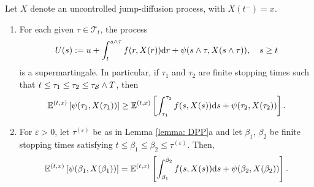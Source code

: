 \begin{corollary}
\label{cor: Corollary 10.5 in ØS}
    Let $X$ denote an uncontrolled jump-diffusion process, with $X(t^-)=x$. 
    \begin{enumerate}[label=(\alph*)]
        \item For each given $\tau \in \mathcal{T}_t$, the process 
        \begin{equation*}
            U(s) := u + \int_t^{s \wedge \tau} f(r, X(r)) \mathrm{d} r + \psi(s \wedge \tau,X(s \wedge \tau)), \quad s \geq t
        \end{equation*}
        is a supermartingale. In particular, if $\tau_1$ and $\tau_2$ are finite stopping times such that $t \leq \tau_1 \leq \tau_2 \leq \tau_{\mathcal{S}} \wedge T$, then
        \begin{equation*}
            \mathbb{E}^{(t,x)} \left[ \psi(\tau_1, X(\tau_1)) \right] \geq \mathbb{E}^{(t,x)}\left[ \int_{\tau_1}^{\tau_2} f(s,X(s)) \mathrm{d} s + \psi(\tau_2, X(\tau_2)) \right].
        \end{equation*}
        \item For $\varepsilon>0$, let $\tau^{(\varepsilon)}$ be as in Lemma \ref{lemma: DPP}a and let $\beta_1$, $\beta_2$ be finite stopping times satisfying $t \leq \beta_1 \leq \beta_2 \leq \tau^{(\varepsilon)}$. Then,
        \begin{equation*}
            \mathbb{E}^{(t,x)}\left[ \psi(\beta_1, X(\beta_1)) \right] = \mathbb{E}^{(t,x)} \left[ \int_{\beta_1}^{\beta_2} f(s,X(s)) \mathrm{d} s + \psi(\beta_2,X(\beta_2))\right].
        \end{equation*}
    \end{enumerate}
\end{corollary}

